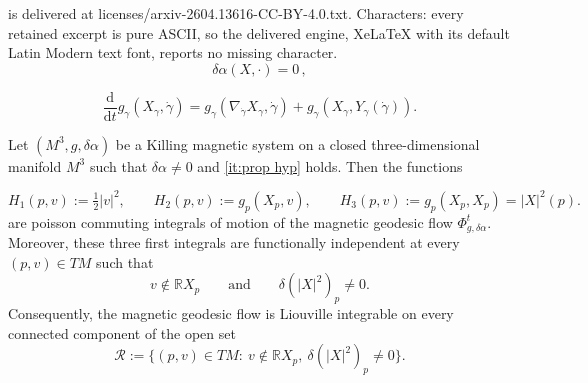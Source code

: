 \documentclass[10pt,a4paper]{amsart}
\def\a{\alpha}
\def\d{\delta}
\begin{document}
is delivered at licenses/arxiv-2604.13616-CC-BY-4.0.txt. Characters: every retained excerpt is pure ASCII, so the delivered engine, XeLaTeX with its default Latin Modern text font, reports no missing character.
\begin{equation}\label{it:prop hyp}
    \d\alpha(X,\cdot)=0 \, ,
\end{equation}

\begin{equation}\label{eq: derivative of contact angle}
    \frac{\mathrm{d}}{\mathrm{d} t} g_{\gamma}(X_{\gamma}, \dot{\gamma}) 
    = g_{\gamma}\left(\nabla_{\dot{\gamma}} X_{\gamma}, \dot{\gamma} \right) 
    + g_{\gamma}\left(X_{\gamma}, Y_{\gamma}(\dot{\gamma}) \right).
\end{equation}

\begin{cor}\label{cor: total integrability in dim 3}
Let \( (M^3,g,\d\alpha) \) be a Killing magnetic system on a closed
three-dimensional manifold \( M^3 \) such that $\d\a\neq 0$ and \eqref{it:prop hyp} holds. Then the functions 

\[
H_1(p,v):=\tfrac12 |v|^2,\qquad
H_2(p,v):=g_p(X_p,v),\qquad
H_3(p,v):=g_p(X_p,X_p)=|X|^2(p).
\]
are poisson commuting integrals of motion of the magnetic geodesic flow $\varPhi_{g,\d\a}^t$. 
Moreover, these three first integrals are functionally independent at every
\((p,v)\in TM\) such that
\[
v\notin \mathbb R X_p
\qquad\text{and}\qquad
\d(|X|^2)_p\neq 0.
\]
Consequently, the magnetic geodesic flow is Liouville integrable on every
connected component of the open set
\[
\mathcal R
:=
\{(p,v)\in TM:\ v\notin \mathbb R X_p,\ \d(|X|^2)_p\neq 0\}.
\]
\end{cor}
\end{document}
